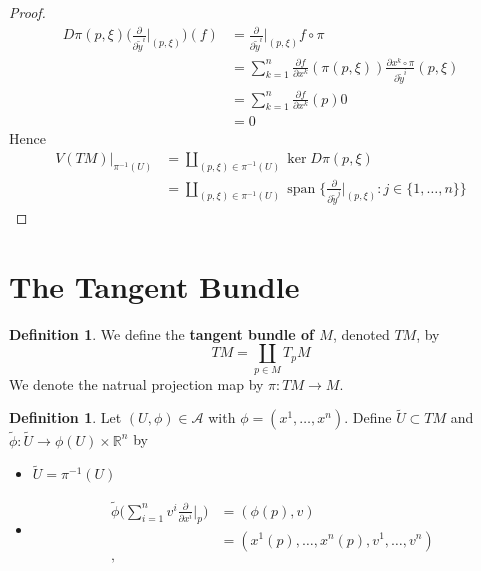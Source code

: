 \documentclass{book}
\theoremstyle{definition}
\newtheorem{defn}[definition]{Definition}
\newcommand{\R}{\mathbb{R}}
\newcommand{\MA}{\mathcal{A}}
\newcommand{\tU}{\tilde{U}}
\newcommand{\tphi}{\tilde{\phi}}
\DeclareMathOperator{\spn}{span}
\DeclareMathOperator*{\0}{\mbf{0}}
\DeclareMathOperator*{\1}{\mbf{1}}
\newcommand{\tbf}[1]{\textbf{#1}}
\newcommand{\p}{\partial}
\begin{document}
\begin{proof}
		\begin{align*}
			D \pi (p, \xi) \bigg( \frac{\p}{\p \tilde{y}^i } \bigg|_{(p, \xi)} \bigg) (f)
			& = \frac{\p}{\p \tilde{y}^i} \bigg|_{(p, \xi)} f \circ \pi \\
			& = \sum_{k=1}^n \frac{\p f }{\p x^k}(\pi (p,\xi)) \frac{\p x^k \circ \pi }{\p \tilde{y}^i}(p,\xi) \\
			& = \sum_{k=1}^n \frac{\p f }{\p x^k}(p) 0 \\
			& = 0
		\end{align*}
		Hence 
		\begin{align*}
			V(TM)|_{\pi^{-1}(U)}
			& = \coprod_{(p, \xi) \in \pi^{-1}(U)} \ker D \pi(p, \xi) \\
			& = \coprod_{(p, \xi) \in \pi^{-1}(U)} \spn \bigg \{ \frac{\p}{\p \tilde{y}^j} \bigg|_{(p, \xi)}: j \in \{1, \ldots, n\} \bigg \} 
		\end{align*}
	\end{proof}
	
	
	
	
	
	
	
	
	
	
	
	
	
	
	
	
	
	
	
	
	
	
	
	
	
	
	
	
	
	
	
	
	
	
	
	
	
	
	
	\newpage
	\section{The Tangent Bundle}
	\begin{defn}
		We define the \tbf{tangent bundle of $M$}, denoted $TM$, by $$TM = \coprod_{p \in M} T_pM$$ 
		We denote the natrual projection map by $\pi: TM \rightarrow M$.
	\end{defn}
	
	\begin{defn}
		Let $(U, \phi) \in \MA$ with $\phi = (x^1, \dots, x^n)$. Define $\tilde{U} \subset TM$ and $\tilde{\phi}: \tilde{U} \rightarrow \phi(U) \times \R^{n}$ by  
		\begin{itemize}
			\item $\tU = \pi^{-1}(U)$
			\item 
			\begin{align*}
				\tphi \bigg(\sum\limits_{i =1}^n v^i \frac{\p}{\p x^i} \bigg|_p \bigg) 
				&= (\phi(p), v) \\
				&= (x^1(p), \dots, x^n(p), v^1, \dots, v^n) \\
, 			\end{align*}
		\end{itemize}
	\end{defn}
\end{document}
